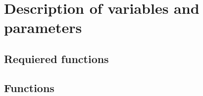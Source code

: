 \chapter{Description of variables and parameters}\label{Glossary}
\section{Requiered functions}
\section{Functions}



